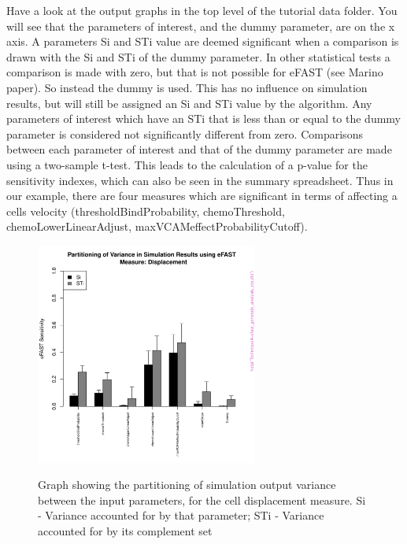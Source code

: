 \documentclass[a4paper,11pt]{article}
\begin{document}
\begin{enumerate}
Have a look at the output graphs in the top level of the tutorial data folder. You will see that the parameters of interest, and the dummy parameter, are on the x axis. A parameters Si and STi value are deemed significant when a comparison is drawn with the Si and STi of the dummy parameter. In other statistical tests a comparison is made with zero, but that is not possible for eFAST (see Marino paper). So instead the dummy is used. This has no influence on simulation results, but will still be assigned an Si and STi value by the algorithm. Any parameters of interest which have an STi that is less than or equal to the dummy parameter is considered not significantly different from zero.  Comparisons between each parameter of interest and that of the dummy parameter are made using a two-sample t-test. This leads to the calculation of a p-value for the sensitivity indexes, which can also be seen in the summary spreadsheet.  Thus in our example, there are four measures which are significant in terms of affecting a cells velocity (thresholdBindProbability, chemoThreshold, chemoLowerLinearAdjust, maxVCAMeffectProbabilityCutoff).


\end{enumerate}
\newpage 
\begin{figure}[h!]
\centering
    \includegraphics[width=0.65\textwidth]{eFAST_Displacement.pdf}\\ \noindent
    \caption{Graph showing the partitioning of simulation output variance between the input parameters, for the cell displacement measure. Si - Variance accounted for by that parameter; STi - Variance accounted for by its complement set}
    \label{eFAST_Results1}
    \end{figure}
\end{document}
